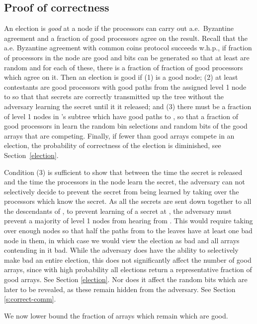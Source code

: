 \documentclass[letterpaper,11pt]{article}
\begin{document}
\subsection{Proof of correctness}\label{correct}

An election is {\it good}  at a node   if the processors can carry out  a.e.\ Byzantine agreement and a  fraction of good processors agree on the result. Recall that the a.e. Byzantine agreement with common coins protocol succeeds w.h.p., if  fraction of processors in the node are good
and bits can be generated so that at least  are random and for each of these, there is a fraction of  fraction of good processors which agree on it. 
Then an election is good if  (1)  is a good node; (2) at least  contestants are good processors  with good paths from 
the assigned  level 1 node to   so that that secrets are correctly transmitted up the tree without the adversary learning the secret until it it released; and (3) there must be a  fraction of level 1 nodes in 's subtree which have good paths to , so that a  fraction of good processors in  learn the random bin selections and random bits of the good arrays that are competing.  Finally, if fewer than  good arrays compete in an election, the probability of correctness of the election is diminished, see Section~\ref{election}. 
  
 Condition (3) is sufficient to show that  between the time the secret is released and the time the processors in the node   learn the secret, the adversary can not selectively decide to prevent the secret from being learned by taking over the processors which know the secret.  As all the secrets are sent down together to all the descendants of , to prevent learning of a secret at , the adversary must prevent a majority of level 1 nodes from hearing from . This would require taking over enough nodes so that half the paths from  to the leaves have at least one bad node in them, in which case we would view the election as bad and all arrays contending in it  bad.  While the adversary does have the ability to selectively make bad an entire election, this does not significantly affect the number of good arrays, since with high probability all elections return a representative fraction of good arrays.  See  Section \ref{election}. Nor does it affect the random bits which are later to be revealed, as these remain hidden from the adversary.  See  Section \ref{s:correct-comm}.

We  now lower  bound the fraction of arrays which remain which are good.
\end{document}
